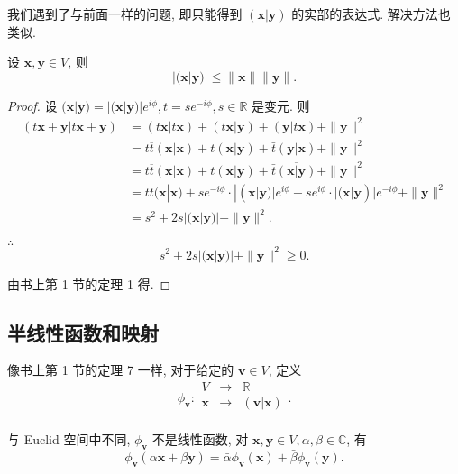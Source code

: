 \documentclass{ctexart}
\begin{document}
我们遇到了与前面一样的问题, 即只能得到 $(\boldsymbol{x}|\boldsymbol{y})$ 的实部的表达式. 解决方法也类似.
\begin{theorem}
    设 $\boldsymbol{x},\boldsymbol{y}\in V$, 则
    \[|(\boldsymbol{x}|\boldsymbol{y})|\leq\|\boldsymbol{x}\|\|\boldsymbol{y}\|.\]
\end{theorem}
\begin{proof}
    设 $(\boldsymbol{x}|\boldsymbol{y})=|(\boldsymbol{x}|\boldsymbol{y})|e^{i\phi},t=se^{-i\phi},s\in\mathbb{R}$ 是变元. 则 
    \begin{align*}
        (t\boldsymbol{x}+\boldsymbol{y}|t\boldsymbol{x}+\boldsymbol{y}) & =(t\boldsymbol{x}|t\boldsymbol{x})+(t\boldsymbol{x}|\boldsymbol{y})+(\boldsymbol{y}|t\boldsymbol{x})+\|\boldsymbol{y}\|^2 \\
        & =t\overline{t}(\boldsymbol{x}|\boldsymbol{x})+t(\boldsymbol{x}|\boldsymbol{y})+\bar{t}(\boldsymbol{y}|\boldsymbol{x})+\|\boldsymbol{y}\|^2 \\
        & =t\overline{t}(\boldsymbol{x}|\boldsymbol{x})+t(\boldsymbol{x}|\boldsymbol{y})+\bar{t}\overline{(\boldsymbol{x}|\boldsymbol{y})}+\|\boldsymbol{y}\|^2 \\
        & =t\overline{t}(\boldsymbol{x}|\boldsymbol{x})+se^{-i\phi}\cdot|(\boldsymbol{x}|\boldsymbol{y})|e^{i\phi}+se^{i\phi}\cdot|(\boldsymbol{x}|\boldsymbol{y})|e^{-i\phi}+\|\boldsymbol{y}\|^2 \\
        & =s^2+2s|(\boldsymbol{x}|\boldsymbol{y})|+\|\boldsymbol{y}\|^2.
    \end{align*}

    $\therefore$
    \[s^2+2s|(\boldsymbol{x}|\boldsymbol{y})|+\|\boldsymbol{y}\|^2\geq0.\]

    由书上第 1 节的定理 1 得.
\end{proof}
\subsection{半线性函数和映射}
像书上第 1 节的定理 7 一样, 对于给定的 $\boldsymbol{v}\in V$, 定义
\[\phi_{\boldsymbol{v}}:\begin{array}{rcl}
    V & \to & \mathbb{R} \\
    \boldsymbol{x} & \to & (\boldsymbol{v}|\boldsymbol{x}) \\
\end{array}.\]

与 Euclid 空间中不同, $\phi_{\boldsymbol{v}}$ 不是线性函数, 对 $\boldsymbol{x},\boldsymbol{y}\in V,\alpha,\beta\in\mathbb{C}$, 有
\[\phi_{\boldsymbol{v}}(\alpha\boldsymbol{x}+\beta\boldsymbol{y})=\bar{\alpha}\phi_{\boldsymbol{v}}(\boldsymbol{x})+\bar{\beta}\phi_{\boldsymbol{v}}(\boldsymbol{y}).\]
\end{document}
